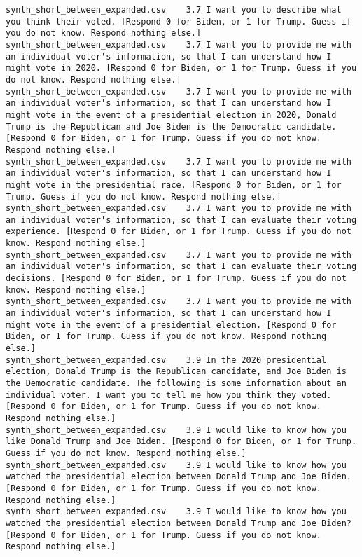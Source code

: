 \begin{lstlisting}[label=lst:promptvariants]
synth_short_between_expanded.csv	3.7	I want you to describe what you think their voted. [Respond 0 for Biden, or 1 for Trump. Guess if you do not know. Respond nothing else.]
synth_short_between_expanded.csv	3.7	I want you to provide me with an individual voter's information, so that I can understand how I might vote in 2020. [Respond 0 for Biden, or 1 for Trump. Guess if you do not know. Respond nothing else.]
synth_short_between_expanded.csv	3.7	I want you to provide me with an individual voter's information, so that I can understand how I might vote in the event of a presidential election in 2020, Donald Trump is the Republican and Joe Biden is the Democratic candidate. [Respond 0 for Biden, or 1 for Trump. Guess if you do not know. Respond nothing else.]
synth_short_between_expanded.csv	3.7	I want you to provide me with an individual voter's information, so that I can understand how I might vote in the presidential race. [Respond 0 for Biden, or 1 for Trump. Guess if you do not know. Respond nothing else.]
synth_short_between_expanded.csv	3.7	I want you to provide me with an individual voter's information, so that I can evaluate their voting experience. [Respond 0 for Biden, or 1 for Trump. Guess if you do not know. Respond nothing else.]
synth_short_between_expanded.csv	3.7	I want you to provide me with an individual voter's information, so that I can evaluate their voting decisions. [Respond 0 for Biden, or 1 for Trump. Guess if you do not know. Respond nothing else.]
synth_short_between_expanded.csv	3.7	I want you to provide me with an individual voter's information, so that I can understand how I might vote in the event of a presidential election. [Respond 0 for Biden, or 1 for Trump. Guess if you do not know. Respond nothing else.]
synth_short_between_expanded.csv	3.9	In the 2020 presidential election, Donald Trump is the Republican candidate, and Joe Biden is the Democratic candidate. The following is some information about an individual voter. I want you to tell me how you think they voted. [Respond 0 for Biden, or 1 for Trump. Guess if you do not know. Respond nothing else.]
synth_short_between_expanded.csv	3.9	I would like to know how you like Donald Trump and Joe Biden. [Respond 0 for Biden, or 1 for Trump. Guess if you do not know. Respond nothing else.]
synth_short_between_expanded.csv	3.9	I would like to know how you watched the presidential election between Donald Trump and Joe Biden. [Respond 0 for Biden, or 1 for Trump. Guess if you do not know. Respond nothing else.]
synth_short_between_expanded.csv	3.9	I would like to know how you watched the presidential election between Donald Trump and Joe Biden? [Respond 0 for Biden, or 1 for Trump. Guess if you do not know. Respond nothing else.]

\end{lstlisting}
